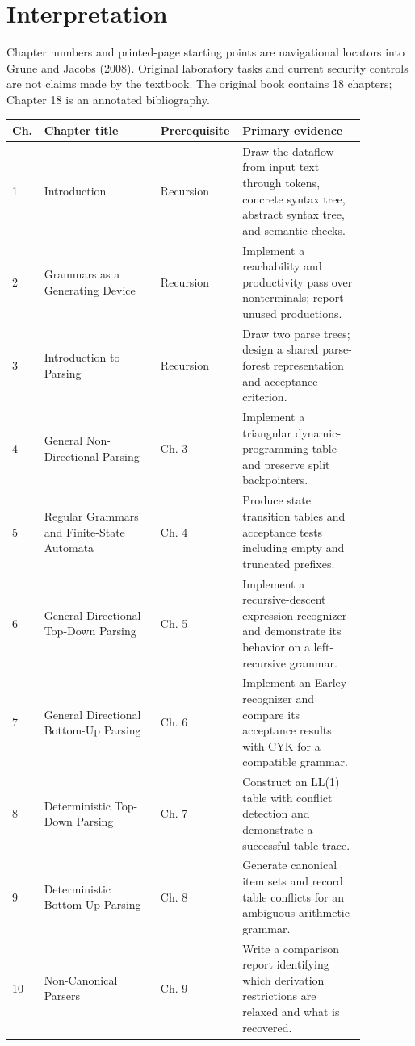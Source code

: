 \documentclass[11pt,letterpaper]{article}
\begin{document}
\makedoctitle\makedocsummary
\tableofcontents\clearpage

\section{Interpretation}
Chapter numbers and printed-page starting points are navigational locators into Grune and Jacobs (2008). Original laboratory tasks and current security controls are not claims made by the textbook. The original book contains 18 chapters; Chapter 18 is an annotated bibliography.\par
\small\begin{longtable}{p{0.05\linewidth}p{0.32\linewidth}p{0.16\linewidth}p{0.34\linewidth}}\toprule Ch. & Chapter title & Prerequisite & Primary evidence\\\midrule\endhead
1 & Introduction & Recursion & Draw the dataflow from input text through tokens, concrete syntax tree, abstract syntax tree, and semantic checks.\\
2 & Grammars as a Generating Device & Recursion & Implement a reachability and productivity pass over nonterminals; report unused productions.\\
3 & Introduction to Parsing & Recursion & Draw two parse trees; design a shared parse-forest representation and acceptance criterion.\\
4 & General Non-Directional Parsing & Ch. 3 & Implement a triangular dynamic-programming table and preserve split backpointers.\\
5 & Regular Grammars and Finite-State Automata & Ch. 4 & Produce state transition tables and acceptance tests including empty and truncated prefixes.\\
6 & General Directional Top-Down Parsing & Ch. 5 & Implement a recursive-descent expression recognizer and demonstrate its behavior on a left-recursive grammar.\\
7 & General Directional Bottom-Up Parsing & Ch. 6 & Implement an Earley recognizer and compare its acceptance results with CYK for a compatible grammar.\\
8 & Deterministic Top-Down Parsing & Ch. 7 & Construct an LL(1) table with conflict detection and demonstrate a successful table trace.\\
9 & Deterministic Bottom-Up Parsing & Ch. 8 & Generate canonical item sets and record table conflicts for an ambiguous arithmetic grammar.\\
10 & Non-Canonical Parsers & Ch. 9 & Write a comparison report identifying which derivation restrictions are relaxed and what is recovered.\\

\end{longtable}
\end{document}
